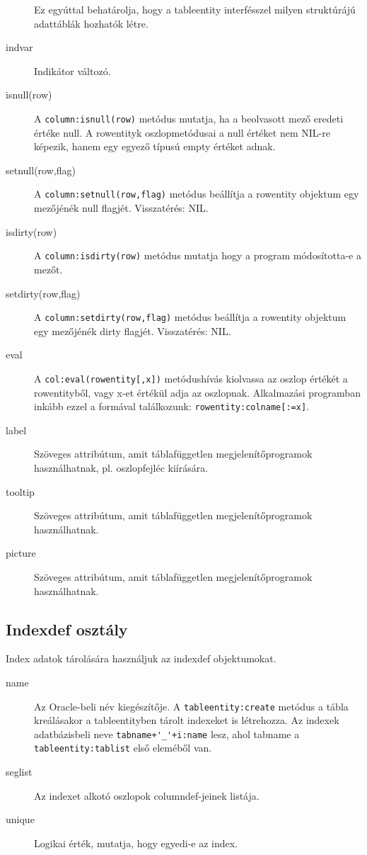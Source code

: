 \begin{description}
    Ez egyúttal behatárolja, hogy a tableentity interfésszel
    milyen struktúrájú adattáblák hozhatók létre.

\item[indvar]
    Indikátor változó.
\item[isnull(row)]
    A \verb!column:isnull(row)! metódus mutatja, 
    ha a beolvasott mező eredeti értéke null.
    A rowentityk oszlopmetódusai a null értéket nem NIL-re
    képezik, hanem egy egyező típusú empty értéket adnak.
\item[setnull(row,flag)]
    A \verb!column:setnull(row,flag)! metódus beállítja
    a rowentity objektum egy mezőjénék null flagjét.
    Visszatérés: NIL.
\item[isdirty(row)]
    A \verb!column:isdirty(row)! metódus mutatja
    hogy a program módosította-e a mezőt.
\item[setdirty(row,flag)]
    A \verb!column:setdirty(row,flag)! metódus beállítja 
    a rowentity objektum egy mezőjénék dirty flagjét.
    Visszatérés: NIL.
\item[eval]
    A \verb!col:eval(rowentity[,x])! metódushívás kiolvassa az oszlop
    értékét a rowentityből, vagy x-et értékül adja az oszlopnak. 
    Alkalmazási programban inkább  ezzel a formával találkozunk: 
    \verb!rowentity:colname[:=x]!.
\item[label]
    Szöveges attribútum, amit táblafüggetlen megjelenítőprogramok
    használhatnak, pl. oszlopfejléc kiírására.
\item[tooltip]
    Szöveges attribútum, amit táblafüggetlen megjelenítőprogramok
    használhatnak.
\item[picture]
    Szöveges attribútum, amit táblafüggetlen megjelenítőprogramok
    használhatnak.
\end{description}


\subsection{Indexdef osztály}

Index adatok tárolására használjuk az indexdef objektumokat.

\begin{description}
\item[name]     
    Az Oracle-beli név kiegészítője.
    A \verb!tableentity:create! metódus a tábla kreálásakor a tableentityben
    tárolt indexeket is létrehozza. Az indexek adatbázisbeli neve 
    \verb!tabname+'_'+i:name! lesz, ahol tabname a 
    \verb!tableentity:tablist! első eleméből van.
\item[seglist]  
    Az indexet alkotó oszlopok columndef-jeinek listája.
\item[unique]   
    Logikai érték, mutatja, hogy egyedi-e  az index.
\end{description}

